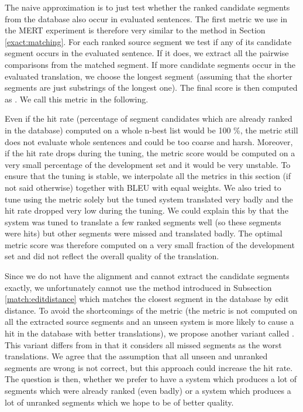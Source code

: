 The naive approximation is to just test whether the ranked candidate segments
from the database also occur in evaluated sentences. The first metric we use
in the MERT experiment is therefore very similar to the 
method in Section \ref{exact:matching}. For each ranked source segment we
test if any of its candidate segment occurs in the evaluated sentence. If it
does, we extract all the pairwise comparisons from the matched segment. If
more candidate segments occur in the evaluated translation, we choose the
longest segment (assuming that the shorter segments are just substrings of the
longest one). The final score is then computed as . We call this metric  in the following.

Even if the hit rate (percentage of segment candidates which are already ranked
in the database) computed on a whole n-best list would be 100 \%, the
 metric still does not evaluate whole sentences and could be
too coarse and harsh. Moreover, if the hit rate drops during the tuning, the
metric score would be computed on a very small percentage of the development set
and it would be very unstable. To ensure that the tuning is stable, we interpolate all
the metrics in this section (if not said otherwise) together with BLEU with
equal weights. We also tried to tune using the  metric
solely but the tuned system translated very badly and the hit rate dropped very
low during the tuning. We could explain this by that the system was tuned to
translate a few ranked segments well (so these segments were hits) but other
segments were missed and translated badly. The optimal metric score was
therefore computed on a very small fraction of the development set and did not
reflect the overall quality of the translation.

Since we do not have the alignment and cannot extract the candidate segments
exactly, we unfortunately cannot use the method introduced in Subsection
\ref{match:editdistance} which matches the closest segment in the database by
edit distance.  To avoid the shortcomings of the  metric
(the metric is not computed on all the extracted source segments and an unseen
system is more likely to cause a hit in the database with better translations), we
propose another variant called . This variant differs
from  in that it considers all missed segments as the worst
translations. We agree that the assumption that all unseen and unranked
segments are wrong is not correct, but this approach could increase the hit
rate. The question is then, whether we prefer to have a system which produces a
lot of segments which were already ranked (even badly) or a system which
produces a lot of unranked segments which we hope to be of better quality.

